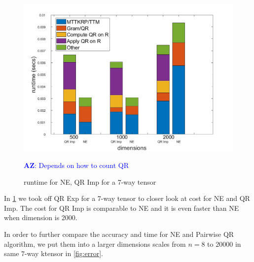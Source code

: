 \documentclass{article}
\newcommand{\AZ}[1]{\textcolor{blue}{\textbf{AZ}: #1}}
\begin{document}
\begin{figure}[ht!]
  \begin{center}
    \includegraphics[scale = 0.3]{7breakdown.jpg}
    \caption[Figure]{runtime for NE, QR Imp for a 7-way tensor \label{fig:7breakdown}}
    \AZ{Depends on how to count QR}
  \end{center}
\end{figure}

In \cref{fig:7breakdown} we took off QR Exp for a 7-way tensor to closer look at cost for NE and QR Imp.  
The cost for QR Imp is comparable to NE and it is even faster than NE when dimension is 2000. 



In order to further compare the accuracy and time for NE and Pairwise QR algorithm, we put them into a larger dimensions scales from $n = 8$ to $20000$ in same 7-way ktensor in \cref{fig:error}.
\end{document}
